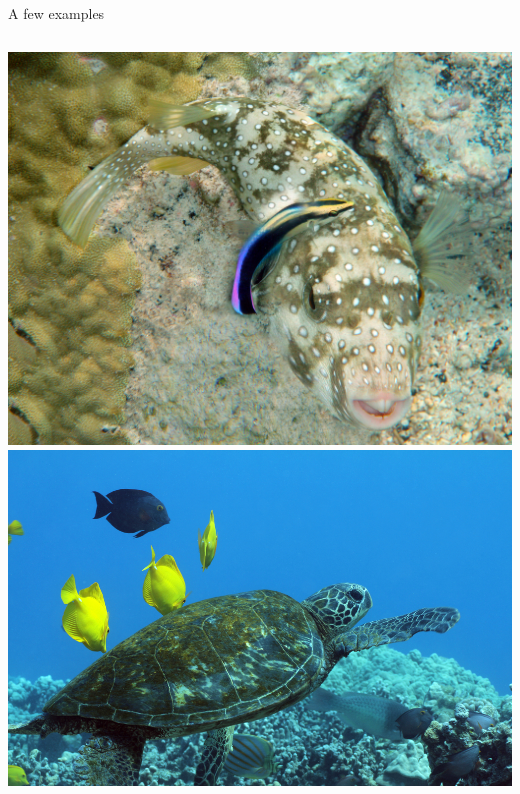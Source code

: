 \documentclass{beamer}
\begin{document}
\begin{frame}{A few examples}
\begin{columns}
        \includegraphics[width=1\textwidth]{fishcoral.jpg} \\
        \includegraphics[width=1\textwidth]{turtle.jpg}

\end{columns}
\end{frame}
\end{document}
